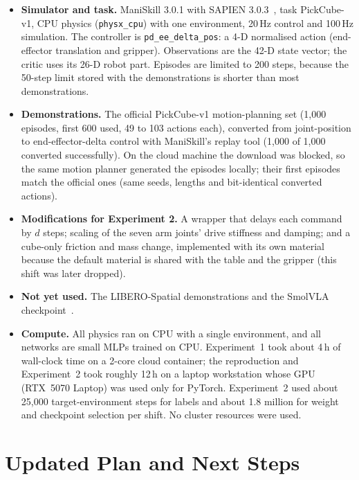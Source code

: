 \begin{itemize}[leftmargin=*, itemsep=2pt]
  \item \textbf{Simulator and task.} ManiSkill 3.0.1 with SAPIEN 3.0.3~\cite{tao2024maniskill3}, task PickCube-v1, CPU physics (\texttt{physx\_cpu}) with one environment, 20\,Hz control and 100\,Hz simulation. The controller is \texttt{pd\_ee\_delta\_pos}: a 4-D normalised action (end-effector translation and gripper). Observations are the 42-D state vector; the critic uses its 26-D robot part. Episodes are limited to 200 steps, because the 50-step limit stored with the demonstrations is shorter than most demonstrations.
  \item \textbf{Demonstrations.} The official PickCube-v1 motion-planning set (1{,}000 episodes, first 600 used, 49 to 103 actions each), converted from joint-position to end-effector-delta control with ManiSkill's replay tool (1{,}000 of 1{,}000 converted successfully). On the cloud machine the download was blocked, so the same motion planner generated the episodes locally; their first episodes match the official ones (same seeds, lengths and bit-identical converted actions).
  \item \textbf{Modifications for Experiment 2.} A wrapper that delays each command by $d$ steps; scaling of the seven arm joints' drive stiffness and damping; and a cube-only friction and mass change, implemented with its own material because the default material is shared with the table and the gripper (this shift was later dropped).
  \item \textbf{Not yet used.} The LIBERO-Spatial demonstrations and the SmolVLA checkpoint~\cite{liu2023libero,shukor2025smolvla}.
  \item \textbf{Compute.} All physics ran on CPU with a single environment, and all networks are small MLPs trained on CPU. Experiment~1 took about 4\,h of wall-clock time on a 2-core cloud container; the reproduction and Experiment~2 took roughly 12\,h on a laptop workstation whose GPU (RTX~5070 Laptop) was used only for PyTorch. Experiment~2 used about 25{,}000 target-environment steps for labels and about 1.8 million for weight and checkpoint selection per shift. No cluster resources were used.
\end{itemize}

\section{Updated Plan and Next Steps}
\label{sec:plan}

